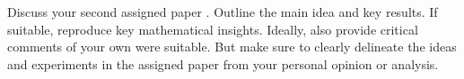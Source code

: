 
Discuss your second assigned paper \cite{Berk.2018}. Outline the main idea and key results. If suitable, reproduce key mathematical insights. Ideally, also provide critical comments of your own were suitable. But make sure to clearly delineate the ideas and experiments in the assigned paper from your personal opinion or analysis.
